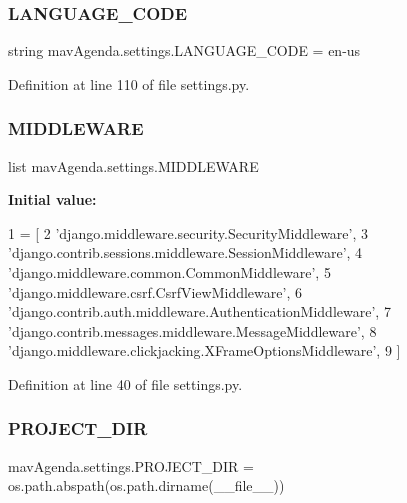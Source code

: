 \subsubsection{\texorpdfstring{L\+A\+N\+G\+U\+A\+G\+E\+\_\+\+C\+O\+DE}{LANGUAGE\_CODE}}
{\footnotesize\ttfamily string mav\+Agenda.\+settings.\+L\+A\+N\+G\+U\+A\+G\+E\+\_\+\+C\+O\+DE = \textquotesingle{}en-\/us\textquotesingle{}}



Definition at line 110 of file settings.\+py.

\mbox{\label{namespacemavAgenda_1_1settings_a5c0140137432ceb328494a9284398f75}} 
\subsubsection{\texorpdfstring{M\+I\+D\+D\+L\+E\+W\+A\+RE}{MIDDLEWARE}}
{\footnotesize\ttfamily list mav\+Agenda.\+settings.\+M\+I\+D\+D\+L\+E\+W\+A\+RE}

{\bfseries Initial value\+:}
\begin{DoxyCode}
1 =  [
2     \textcolor{stringliteral}{'django.middleware.security.SecurityMiddleware'},
3     \textcolor{stringliteral}{'django.contrib.sessions.middleware.SessionMiddleware'},
4     \textcolor{stringliteral}{'django.middleware.common.CommonMiddleware'},
5     \textcolor{stringliteral}{'django.middleware.csrf.CsrfViewMiddleware'},
6     \textcolor{stringliteral}{'django.contrib.auth.middleware.AuthenticationMiddleware'},
7     \textcolor{stringliteral}{'django.contrib.messages.middleware.MessageMiddleware'},
8     \textcolor{stringliteral}{'django.middleware.clickjacking.XFrameOptionsMiddleware'},
9 ]
\end{DoxyCode}


Definition at line 40 of file settings.\+py.

\mbox{\label{namespacemavAgenda_1_1settings_ab4ce42a5401340f89c8d454623c34d5e}} 
\subsubsection{\texorpdfstring{P\+R\+O\+J\+E\+C\+T\+\_\+\+D\+IR}{PROJECT\_DIR}}
{\footnotesize\ttfamily mav\+Agenda.\+settings.\+P\+R\+O\+J\+E\+C\+T\+\_\+\+D\+IR = os.\+path.\+abspath(os.\+path.\+dirname(\+\_\+\+\_\+file\+\_\+\+\_\+))}



